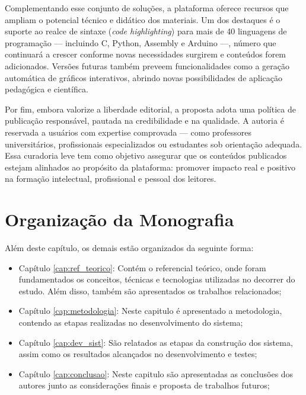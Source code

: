 Complementando esse conjunto de soluções, a plataforma oferece recursos que ampliam o potencial técnico e didático dos materiais. Um dos destaques é o suporte ao realce de sintaxe (\textit{code highlighting}) para mais de 40 linguagens de programação — incluindo C, Python, Assembly e Arduino —, número que continuará a crescer conforme novas necessidades surgirem e conteúdos forem adicionados. Versões futuras também preveem funcionalidades como a geração automática de gráficos interativos, abrindo novas possibilidades de aplicação pedagógica e científica.

Por fim, embora valorize a liberdade editorial, a proposta adota uma política de publicação responsável, pautada na credibilidade e na qualidade. A autoria é reservada a usuários com expertise comprovada — como professores universitários, profissionais especializados ou estudantes sob orientação adequada. Essa curadoria leve tem como objetivo assegurar que os conteúdos publicados estejam alinhados ao propósito da plataforma: promover impacto real e positivo na formação intelectual, profissional e pessoal dos leitores.

\section{Organização da Monografia}

Além deste capítulo, os demais estão organizados da seguinte forma:

\begin{itemize}
    \item Capítulo \ref{cap:ref_teorico}: Contém o referencial teórico, onde foram fundamentados os conceitos, técnicas e tecnologias utilizadas no decorrer do estudo. Além disso, também são apresentados os trabalhos relacionados;
    \item Capítulo \ref{cap:metodologia}: Neste capitulo é apresentado a metodologia, contendo as etapas realizadas no desenvolvimento do sistema;
    \item Capítulo \ref{cap:dev_sist}: São relatados as etapas da construção dos sistema, assim como os resultados alcançados no desenvolvimento e testes;
    \item Capítulo \ref{cap:conclusao}: Neste capitulo são apresentadas as conclusões dos autores junto as considerações finais e proposta de trabalhos futuros;
\end{itemize}